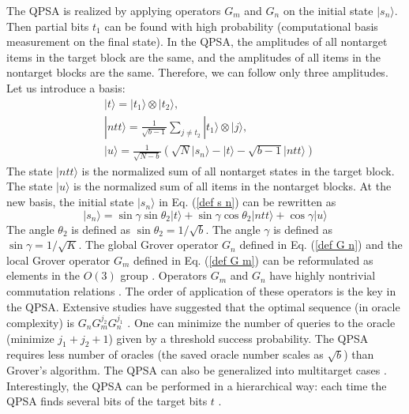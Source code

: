 \documentclass[%
 twocolumn,
 10pt,
 superscriptaddress,
 longbibliography,
 amsmath,amssymb,
 aps,
 pra,
floatfix,
]{revtex4-1}
\begin{document}
The QPSA is realized by  applying operators $G_{m}$ and $G_{n}$ on the initial state $|s_n\rangle$. Then partial bits $t_1$ can be found with high probability (computational basis measurement on the final state). In the QPSA, the amplitudes of all nontarget items in the target block are the same, and the amplitudes of all items in the nontarget blocks are the same. Therefore, we can follow only three amplitudes. Let us introduce a basis:
\begin{subequations}
	\begin{align}
		\label{basis t}   & |t\rangle = |t_1\rangle\otimes |t_2\rangle,                                                      \\
		\label{basis ntt} & |ntt\rangle = \frac 1 {\sqrt{b-1}}\sum_{j\neq t_2}|t_1\rangle\otimes |j\rangle,                  \\
		\label{basis u}   & |u\rangle =  \frac{1}{\sqrt{N-b}}\left(\sqrt N|s_n\rangle-|t\rangle-\sqrt{b-1}|ntt\rangle\right)
	\end{align}
\end{subequations}
The state $|ntt\rangle$ is the normalized sum of all nontarget states in the target block. The state $|u\rangle$ is the normalized sum of all items in the nontarget blocks. At the new basis, the initial state $|s_n\rangle$ in Eq. (\ref{def s n}) can be rewritten as
\begin{equation}
	\label{def s n rewrite}
	|s_n\rangle = \sin \gamma \sin\theta_2|t\rangle + \sin \gamma \cos\theta_2|ntt\rangle+\cos\gamma |u\rangle
\end{equation}
The angle $\theta_2$ is defined as $\sin\theta_2 = 1/\sqrt b$. The angle $\gamma$ is defined as $\sin\gamma = 1/\sqrt K$. The global Grover operator $G_n$ defined in Eq. (\ref{def G n}) and the local Grover operator $G_m$ defined in Eq. (\ref{def G m}) can be reformulated as elements in the $O(3)$ group \cite{KV06}. Operators $G_{m}$ and $G_{n}$ have highly nontrivial commutation relations \cite{KV06}. The order of application of these operators is the key in the QPSA. Extensive studies have suggested that the optimal sequence (in oracle complexity) is $G_nG_m^{j_2}G_n^{j_1}$ \cite{KL06,KV06}. One can minimize the number of queries to the oracle (minimize $j_1+j_2+1$) given by a threshold success probability. The QPSA requires less number of oracles (the saved oracle number scales as $\sqrt b$) than Grover's algorithm. The QPSA can also be generalized into multitarget cases \cite{CK07,ZK18}. Interestingly, the QPSA can be performed in a hierarchical way: each time the QPSA finds several bits of the target bits $t$ \cite{KX07}.
\end{document}
